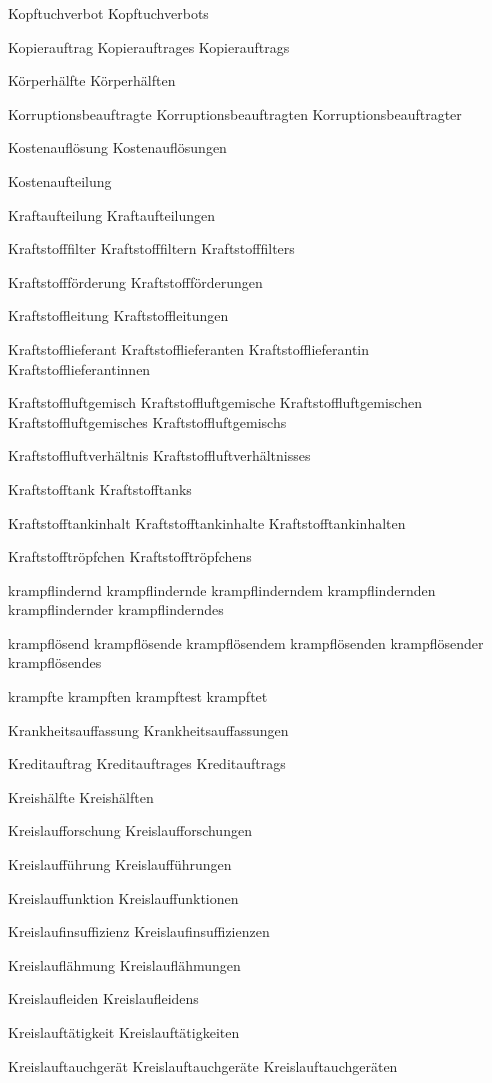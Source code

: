 Kopftuchverbot
Kopftuchverbots

Kopierauftrag
Kopierauftrages
Kopierauftrags

Körperhälfte
Körperhälften

Korruptionsbeauftragte
Korruptionsbeauftragten
Korruptionsbeauftragter

Kostenauflösung
Kostenauflösungen

Kostenaufteilung

Kraftaufteilung
Kraftaufteilungen

Kraftstofffilter
Kraftstofffiltern
Kraftstofffilters

Kraftstoffförderung
Kraftstoffförderungen

Kraftstoffleitung
Kraftstoffleitungen

Kraftstofflieferant
Kraftstofflieferanten
Kraftstofflieferantin
Kraftstofflieferantinnen

Kraftstoffluftgemisch
Kraftstoffluftgemische
Kraftstoffluftgemischen
Kraftstoffluftgemisches
Kraftstoffluftgemischs

Kraftstoffluftverhältnis
Kraftstoffluftverhältnisses

Kraftstofftank
Kraftstofftanks

Kraftstofftankinhalt
Kraftstofftankinhalte
Kraftstofftankinhalten

Kraftstofftröpfchen
Kraftstofftröpfchens

krampflindernd
krampflindernde
krampflinderndem
krampflindernden
krampflindernder
krampflinderndes

krampflösend
krampflösende
krampflösendem
krampflösenden
krampflösender
krampflösendes

krampfte
krampften
krampftest
krampftet

Krankheitsauffassung
Krankheitsauffassungen

Kreditauftrag
Kreditauftrages
Kreditauftrags

Kreishälfte
Kreishälften

Kreislaufforschung
Kreislaufforschungen

Kreislaufführung
Kreislaufführungen

Kreislauffunktion
Kreislauffunktionen

Kreislaufinsuffizienz
Kreislaufinsuffizienzen

Kreislauflähmung
Kreislauflähmungen

Kreislaufleiden
Kreislaufleidens

Kreislauftätigkeit
Kreislauftätigkeiten

Kreislauftauchgerät
Kreislauftauchgeräte
Kreislauftauchgeräten

